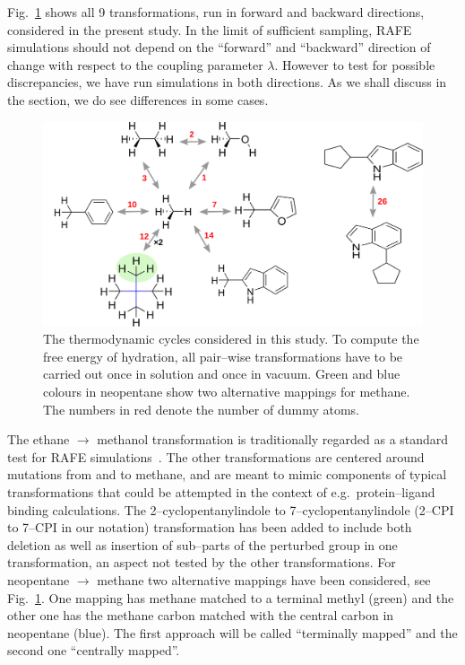 \documentclass[journal=jctcce,manuscript=article]{achemso}
\begin{document}
Fig.~\ref{fig:cycles} shows all 9 transformations, run in forward and
backward directions, considered in the present study. In the limit of
sufficient sampling, RAFE simulations should not depend on the
``forward'' and ``backward'' direction of change with respect to the
coupling parameter $\lambda$.  However to test for possible
discrepancies, we have run simulations in both directions.  As we
shall discuss in the section, we do see
differences in some cases.
\begin{figure}[ht]
  \includegraphics[width=\textwidth]{figures/cycles.pdf}
  \caption{The thermodynamic cycles considered in this study.  To
    compute the free energy of hydration, all pair--wise
    transformations have to be carried out once in solution and once
    in vacuum.  Green and blue colours in neopentane show two
    alternative mappings for methane.  The numbers in red denote the
    number of dummy atoms.}
  \label{fig:cycles}
\end{figure}

The ethane $\rightarrow$ methanol transformation is traditionally
regarded as a standard test for RAFE
simulations~\cite{doi:10.1063/1.449208, doi:10.1021/jp981629f}.   The
other transformations are centered around mutations from and to
methane, and are meant to mimic components of typical transformations that could be attempted
in the context of e.g.\ protein--ligand binding calculations. The
2--cyclopentanylindole to 7--cyclopentanylindole (2--CPI to 7--CPI in our notation)
transformation has been added to include both deletion as well as
insertion of sub--parts of the perturbed group in one transformation, an aspect not tested by the other transformations.  For
neopentane $\rightarrow$ methane two
alternative mappings have been considered, see Fig.~\ref{fig:cycles}.  One mapping has methane matched to a terminal methyl (green) and the other
one has the methane carbon matched with the central carbon in
neopentane (blue).  The first approach will be called ``terminally mapped'' and
the second one ``centrally mapped''.
\end{document}
